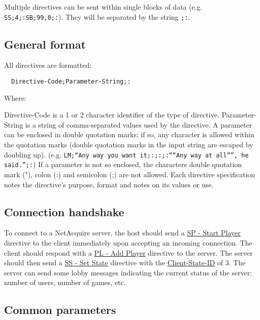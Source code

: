 \documentclass{article}
\providecommand{\wiredata}[1]{\texttt{{#1}}}
\begin{document}
Multiple directives can be sent within single blocks of data (e.g. \wiredata{SS;4;:SB;99,0;:}). They will be separated by the string \wiredata{;:}.

\subsection{General format} %
\label{sub:general_format}

All directives are formatted:
\begin{verbatim}
  Directive-Code;Parameter-String;:
\end{verbatim}

Where:

Directive-Code is a 1 or 2 character identifier of the type of directive.
Parameter-String is a string of comma-separated values used by the directive. A parameter can be enclosed in double quotation marks; if so, any character is allowed within the quotation marks (double quotation marks in the input string are escaped by doubling up). (e.g. \wiredata{LM;``Any way you want it;:;:;:````Any way at all'''', he said.'';:}) If a parameter is not so enclosed, the characters double quotation mark ("), colon (:) and semicolon (;) are not allowed.
Each directive specification notes the directive's purpose, format and notes on its values or use.


\subsection{Connection handshake} %
\label{sub:connection_handshake}

To connect to a NetAcquire server, the host should send a \hyperref[ssub:sp_start_player]{SP - Start Player} directive to the client immediately upon accepting an incoming connection. The client should respond with a \hyperref[ssub:pl_add_player]{PL - Add Player} directive to the server. The server should then send a \hyperref[ssub:ss_set_state]{SS - Set State} directive with the \hyperref[ssub:client_state_id]{Client-State-ID} of 3. The server can send some lobby messages indicating the current status of the server: number of users, number of games, etc.


\subsection{Common parameters} %
\label{sub:common_parameters}
\end{document}

